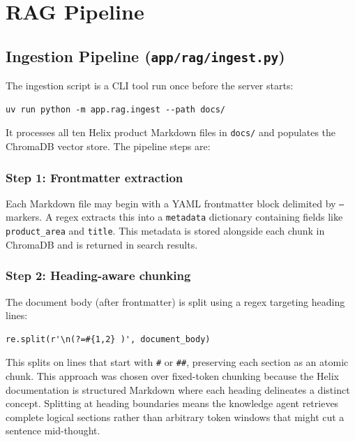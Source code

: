 \documentclass[12pt,a4paper]{article}
\begin{document}
\section{RAG Pipeline}

\subsection{Ingestion Pipeline (\texttt{app/rag/ingest.py})}

The ingestion script is a CLI tool run once before the server starts:

\begin{lstlisting}[style=bash, numbers=none]
uv run python -m app.rag.ingest --path docs/
\end{lstlisting}

It processes all ten Helix product Markdown files in \texttt{docs/} and populates the ChromaDB vector store. The pipeline steps are:

\subsubsection{Step 1: Frontmatter extraction}

Each Markdown file may begin with a YAML frontmatter block delimited by \texttt{---} markers. A regex extracts this into a \texttt{metadata} dictionary containing fields like \texttt{product\_area} and \texttt{title}. This metadata is stored alongside each chunk in ChromaDB and is returned in search results.

\subsubsection{Step 2: Heading-aware chunking}

The document body (after frontmatter) is split using a regex targeting heading lines:

\begin{lstlisting}[style=python, numbers=none]
re.split(r'\n(?=#{1,2} )', document_body)
\end{lstlisting}

This splits on lines that start with \texttt{\#} or \texttt{\#\#}, preserving each section as an atomic chunk. This approach was chosen over fixed-token chunking because the Helix documentation is structured Markdown where each heading delineates a distinct concept. Splitting at heading boundaries means the knowledge agent retrieves complete logical sections rather than arbitrary token windows that might cut a sentence mid-thought.
\end{document}
